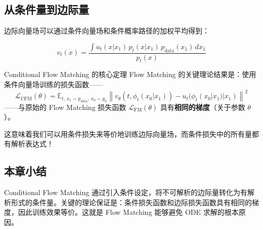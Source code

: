 \subsection{从条件量到边际量}

边际向量场可以通过条件向量场和条件概率路径的加权平均得到：

$$v_t(x) = \frac{\int u_t(x | x_1) \, p_t(x | x_1) \, p_{\text{data}}(x_1) \, dx_1}{p_t(x)}$$

\begin{importantbox}{Conditional Flow Matching 的核心定理}
Flow Matching 的关键理论结果是：使用条件向量场训练的损失函数——
$$\mathcal{L}_{\text{CFM}}(\theta) = \mathbb{E}_{t, \, x_1 \sim p_{\text{data}}, \, x_0 \sim p_0} \left\| v_\theta(t, \phi_t(x_0 | x_1)) - u_t(\phi_t(x_0 | x_1) | x_1) \right\|^2$$
——与原始的 Flow Matching 损失函数 $\mathcal{L}_{\text{FM}}(\theta)$ 具有\textbf{相同的梯度}（关于参数 $\theta$）。

这意味着我们可以用条件损失来等价地训练边际向量场，而条件损失中的所有量都有解析表达式！
\end{importantbox}

\subsection{本章小结}

Conditional Flow Matching 通过引入条件设定，将不可解析的边际量转化为有解析形式的条件量。关键的理论保证是：条件损失函数和边际损失函数具有相同的梯度，因此训练效果等价。这就是 Flow Matching 能够避免 ODE 求解的根本原因。


